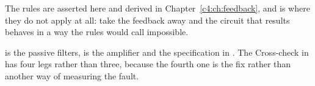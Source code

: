 The rules are asserted here and derived in Chapter~\ref{c4:ch:feedback}, and
 is where they do not apply at all: take the feedback away and the circuit
that results behaves in a way the rules would call impossible.

 is the passive filters,  is the amplifier and the
specification in . The Cross-check in  has four legs
rather than three, because the fourth one is the fix rather than another way of measuring the
fault.





